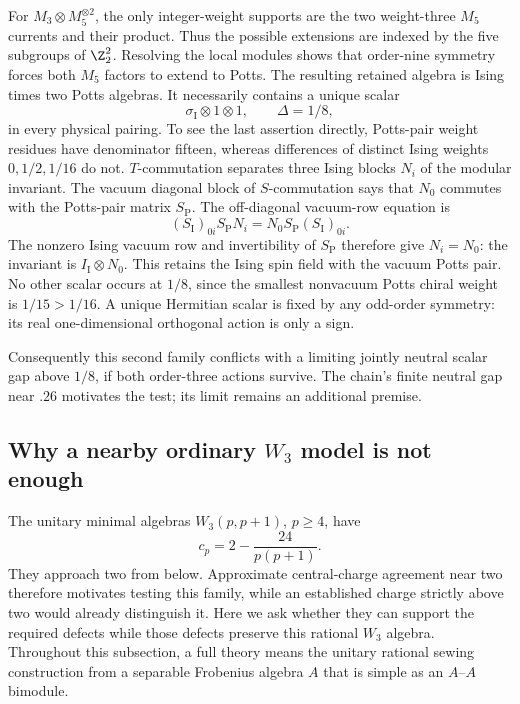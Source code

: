 For $M_3\otimes M_5^{\otimes2}$, the only integer-weight supports
are the two weight-three $M_5$ currents and their product. Thus
the possible extensions are indexed by the five subgroups of
$\Z_2^2$. Resolving the local modules shows that order-nine
symmetry forces both $M_5$ factors to extend to Potts. The
resulting retained algebra is Ising times two Potts algebras.
It necessarily contains a unique scalar
\[
 \sigma_{\mathrm I}\otimes1\otimes1,
 \qquad \Delta=1/8,
\]
in every physical pairing. To see the last assertion directly,
Potts-pair weight residues have denominator fifteen, whereas
differences of distinct Ising weights $0,1/2,1/16$ do not.
$T$-commutation separates three Ising blocks $N_i$ of the modular
invariant. The vacuum diagonal block of $S$-commutation says
that $N_0$ commutes with the Potts-pair matrix $S_{\mathrm P}$.
The off-diagonal vacuum-row equation is
\[
 (S_{\mathrm I})_{0i}S_{\mathrm P}N_i
 =N_0S_{\mathrm P}(S_{\mathrm I})_{0i}.
\]
The nonzero Ising vacuum row and invertibility of $S_{\mathrm P}$
therefore give $N_i=N_0$: the invariant is
$I_{\mathrm I}\otimes N_0$. This retains the Ising spin field
with the vacuum Potts pair. No other scalar occurs at $1/8$, since the smallest
nonvacuum Potts chiral weight is $1/15>1/16$. A unique Hermitian
scalar is fixed by any odd-order symmetry: its real one-dimensional
orthogonal action is only a sign.

Consequently this second family conflicts with a limiting jointly
neutral scalar gap above $1/8$, if both order-three actions survive.
The chain's finite neutral gap near $.26$ motivates the test; its
limit remains an additional premise.

\subsection{Why a nearby ordinary \texorpdfstring{$W_3$}{W3} model is not enough}
\label{sec:identification-W3}

The unitary minimal algebras $W_3(p,p+1)$, $p\geq4$, have
\[
 c_p=2-\frac{24}{p(p+1)}.
\]
They approach two from below. Approximate central-charge agreement near
two therefore motivates testing this family, while an established charge
strictly above two would already distinguish it. Here we ask whether they
can support the required defects while those defects preserve this
rational $W_3$ algebra. Throughout this subsection, a full theory means
the unitary rational sewing construction from a separable Frobenius
algebra $A$ that is simple as an $A$--$A$ bimodule.

